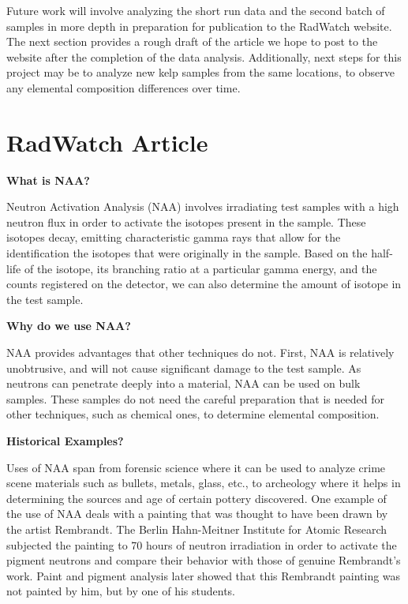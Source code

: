 \documentclass[]{article}
\begin{document}
Future work will involve analyzing the short run data and the second batch of samples in more depth in preparation for publication to the RadWatch website. The next section provides a rough draft of the article we hope to post to the website after the completion of the data analysis. Additionally, next steps for this project may be to analyze new kelp samples from the same locations, to observe any elemental composition differences over time. 

\pagebreak


\section{RadWatch Article}

\textbf{What is NAA?}

Neutron Activation Analysis (NAA) involves irradiating test samples with a high neutron flux in order to activate the isotopes present in the sample. These isotopes decay, emitting characteristic gamma rays that allow for the identification the isotopes that were originally in the sample. Based on the half-life of the isotope, its branching ratio at a particular gamma energy, and the counts registered on the detector, we can also determine the amount of isotope in the test sample.

\textbf{Why do we use NAA?}


NAA provides advantages that other techniques do not. First, NAA is relatively unobtrusive, and will not cause significant damage to the test sample. As neutrons can penetrate deeply into a material, NAA can be used on bulk samples. These samples do not need the careful preparation that is needed for other techniques, such as chemical ones, to determine elemental composition.

\textbf{Historical Examples?}


Uses of NAA span from forensic science where it can be used to analyze crime scene materials such as bullets, metals, glass, etc., to archeology where it helps in determining the sources and age of certain pottery discovered. One example of the use of NAA deals with a painting that was thought to have been drawn by the artist Rembrandt. The Berlin Hahn-Meitner Institute for Atomic Research subjected the painting to 70 hours of neutron irradiation in order to activate the pigment neutrons and compare their behavior with those of genuine Rembrandt’s work. Paint and pigment analysis later showed that this Rembrandt painting was not painted by him, but by one of his students. 
\end{document}
